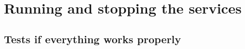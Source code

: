 \section{Running and stopping the services}
\TODO{}

\subsection{Tests if everything works properly}

